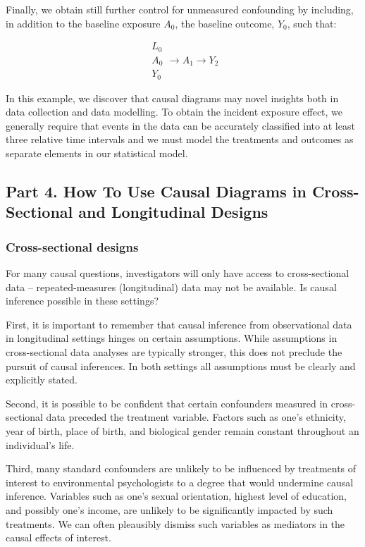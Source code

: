\documentclass[
  singlecolumn]{article}
\begin{document}
Finally, we obtain still further control for unmeasured confounding by
including, in addition to the baseline exposure \(A_0\), the baseline
outcome, \(Y_0\), such that:

\[
\boxed{
\begin{aligned}
L_{0} \\
A_{0} \\
Y_{0}
\end{aligned}
}
\to A_{1} \to Y_{2}
\]

In this example, we discover that causal diagrams may novel insights
both in data collection and data modelling. To obtain the incident
exposure effect, we generally require that events in the data can be
accurately classified into at least three relative time intervals and we
must model the treatments and outcomes as separate elements in our
statistical model.

\subsection{Part 4. How To Use Causal Diagrams in Cross-Sectional and
Longitudinal
Designs}\label{part-4.-how-to-use-causal-diagrams-in-cross-sectional-and-longitudinal-designs}

\subsubsection{Cross-sectional designs}\label{cross-sectional-designs}

For many causal questions, investigators will only have access to
cross-sectional data -- repeated-measures (longitudinal) data may not be
available. Is causal inference possible in these settings?

First, it is important to remember that causal inference from
observational data in longitudinal settings hinges on certain
assumptions. While assumptions in cross-sectional data analyses are
typically stronger, this does not preclude the pursuit of causal
inferences. In both settings all assumptions must be clearly and
explicitly stated.

Second, it is possible to be confident that certain confounders measured
in cross-sectional data preceded the treatment variable. Factors such as
one's ethnicity, year of birth, place of birth, and biological gender
remain constant throughout an individual's life.

Third, many standard confounders are unlikely to be influenced by
treatments of interest to environmental psychologists to a degree that
would undermine causal inference. Variables such as one's sexual
orientation, highest level of education, and possibly one's income, are
unlikely to be significantly impacted by such treatments. We can often
pleausibly dismiss such variables as mediators in the causal effects of
interest.
\end{document}
